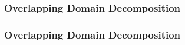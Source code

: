 \subsubsection{Overlapping Domain Decomposition}
\begin{frame}
  \frametitle<presentation>{Overlapping Domain Decomposition}

  \begin{columns}
    \begin{column}{0.6\linewidth}
    

\end{column}
\end{columns}
\end{frame}

